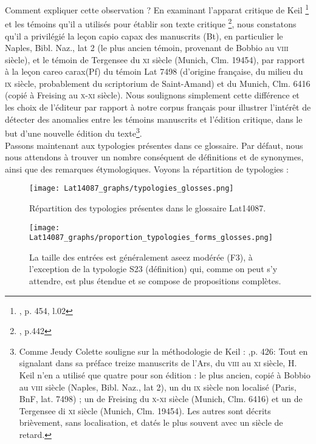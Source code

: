 \documentclass[a4paper, twoside, 12pt]{book}
\begin{document}
{Comment expliquer cette observation ? En examinant l'apparat critique de Keil \footnote{\cite{keil1857grammatici}, p. 454, l.02} et les témoins qu'il a utilisés pour établir son texte critique \footnote{\cite{keil1857grammatici}, p.442}, nous constatons qu'il a privilégié la leçon \og{}capio capax\fg{} des manuscrits (Bt), en particulier le Naples, Bibl. Naz., lat 2 (le plus ancien témoin, provenant de Bobbio au \textsc{viii}\ieme{} siècle), et le témoin de Tergensee du \textsc{xi}\ieme{} siècle (Munich, Clm. 19454), par rapport à la leçon \og{}careo carax\fg{}(Pf) du témoin Lat 7498 (d'origine française, du milieu du \textsc{ix}\ieme{} siècle, probablement du scriptorium de Saint-Amand) et du Munich, Clm. 6416 (copié à Freising au \textsc{x}\ieme{}-\textsc{xi}\ieme{} siècle). Nous soulignons simplement cette différence et les choix de l'éditeur par rapport à notre corpus \og{}français\fg{} pour illustrer l'intérêt de détecter des anomalies entre les témoins manuscrits et l'édition critique, dans le but d'une nouvelle édition du texte\footnote{Comme Jeudy Colette souligne sur la méthodologie de Keil : \cite{jeudy1974manuscrits},p. 426:  \og{} Tout en signalant dans sa préface treize manuscrits de l’Ars, du \textsc{viii}\ieme{} au \textsc{xi}\ieme{} siècle, H. Keil n’en a utilisé que quatre pour son édition : le plus ancien, copié à Bobbio au \textsc{viii}\ieme{} siècle (Naples, Bibl. Naz., lat 2), un du \textsc{ix}\ieme{} siècle non localisé (Paris, BnF, lat. 7498) ; un de Freising du \textsc{x}\ieme{}-\textsc{xi}\ieme{} siècle (Munich, Clm. 6416) et un de Tergensee di \textsc{xi}\ieme{} siècle (Munich, Clm. 19454). Les autres sont décrits brièvement, sans localisation, et datés le plus souvent avec un siècle de retard.\fg{}}. \\


Passons maintenant aux typologies présentes dans ce glossaire. Par défaut, nous nous attendons à trouver un nombre conséquent de définitions et de synonymes, ainsi que des remarques étymologiques. Voyons la répartition de typologies : \\

\begin{figure}[H]
  \centering
  \texttt{[image: Lat14087\_graphs/typologies\_glosses.png]}
  \caption{Répartition des typologies présentes dans le glossaire Lat14087.}
  \label{fig:typologiesLat14087}
\end{figure}

\begin{figure}[H]
  \centering
  \texttt{[image: Lat14087\_graphs/proportion\_typologies\_forms\_glosses.png]}
  \caption{La taille des entrées est généralement aseez modérée (F3), à l'exception de la typologie S23 (définition) qui, comme on peut s'y attendre, est plus étendue et se compose de propositions complètes.}
  \label{fig:tailletypologiesLat14087}
\end{figure}

}
\end{document}
